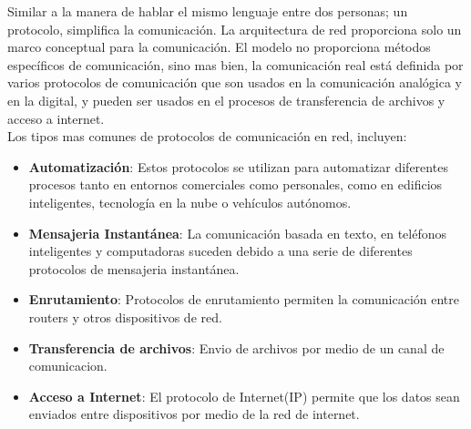 Similar a la manera de hablar el mismo lenguaje entre dos personas; un protocolo, simplifica la comunicación. La arquitectura de red proporciona solo un marco conceptual para la comunicación. El modelo no proporciona métodos específicos de comunicación, sino mas bien, la comunicación real está definida por varios protocolos de comunicación que son usados en la comunicación analógica y en la digital, y pueden ser usados en el procesos de transferencia de archivos y acceso a internet.\\

Los tipos mas comunes de protocolos de comunicación en red, incluyen:

\begin{itemize}
    \item \textbf{Automatización}: Estos protocolos se utilizan para automatizar diferentes procesos tanto en entornos comerciales como personales, como en edificios inteligentes, tecnología en la nube o vehículos autónomos.
    \item \textbf{Mensajeria Instantánea}: La comunicación basada en texto, en teléfonos inteligentes y computadoras suceden debido a una serie de diferentes protocolos de mensajeria instantánea.
    \item \textbf{Enrutamiento}: Protocolos de enrutamiento permiten la comunicación entre routers y otros dispositivos de red.
    \item \textbf{Transferencia de archivos}: Envio de archivos por medio de un canal de comunicacion.
    \item \textbf{Acceso a Internet}: El protocolo de Internet(IP) permite que los datos sean enviados entre dispositivos por medio de la red de internet.
\end{itemize}

